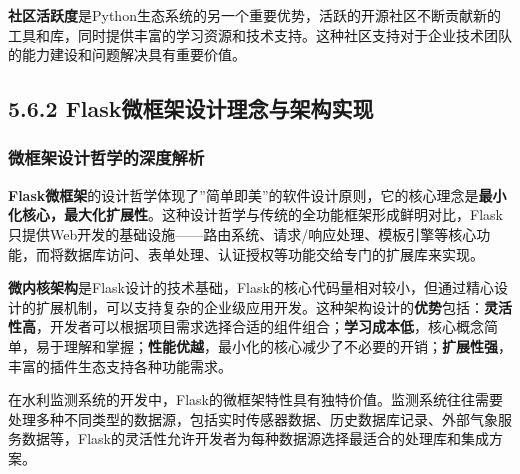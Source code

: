 \textbf{社区活跃度}是Python生态系统的另一个重要优势，活跃的开源社区不断贡献新的工具和库，同时提供丰富的学习资源和技术支持。这种社区支持对于企业技术团队的能力建设和问题解决具有重要价值。

\subsection{5.6.2 Flask微框架设计理念与架构实现}\label{flaskux5faeux6846ux67b6ux8bbeux8ba1ux7406ux5ff5ux4e0eux67b6ux6784ux5b9eux73b0}

\subsubsection{微框架设计哲学的深度解析}\label{ux5faeux6846ux67b6ux8bbeux8ba1ux54f2ux5b66ux7684ux6df1ux5ea6ux89e3ux6790}

\textbf{Flask微框架}的设计哲学体现了''简单即美''的软件设计原则，它的核心理念是\textbf{最小化核心，最大化扩展性}。这种设计哲学与传统的全功能框架形成鲜明对比，Flask只提供Web开发的基础设施------路由系统、请求/响应处理、模板引擎等核心功能，而将数据库访问、表单处理、认证授权等功能交给专门的扩展库来实现。

\textbf{微内核架构}是Flask设计的技术基础，Flask的核心代码量相对较小，但通过精心设计的扩展机制，可以支持复杂的企业级应用开发。这种架构设计的\textbf{优势}包括：\textbf{灵活性高}，开发者可以根据项目需求选择合适的组件组合；\textbf{学习成本低}，核心概念简单，易于理解和掌握；\textbf{性能优越}，最小化的核心减少了不必要的开销；\textbf{扩展性强}，丰富的插件生态支持各种功能需求。

在水利监测系统的开发中，Flask的微框架特性具有独特价值。监测系统往往需要处理多种不同类型的数据源，包括实时传感器数据、历史数据库记录、外部气象服务数据等，Flask的灵活性允许开发者为每种数据源选择最适合的处理库和集成方案。


